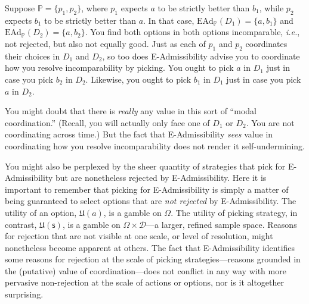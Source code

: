 \documentclass[a4paper]{article}
\newcommand\D{\mathcal{D}}
\newcommand\s{\mathsf{s}}
\renewcommand\P{\mathbb{P}} %
\newcommand\EAd{\mathrm{EAd}}
\newcommand\U{\mathfrak{U}} %
\newcommand{\IP}{\P}
\renewcommand{\color}[1]{}
\newenvironment{CCM rewritten}
{\begingroup\color{blue}} %
{\endgroup}              %
\begin{document}
{{	
	Suppose $\IP = \{p_1, p_2\}$, where $p_1$ expects $a$ to be strictly better than $b_1$, while $p_2$ expects $b_1$ to be strictly better than $a$. In that case, $\EAd_\IP(D_1)=\{a,b_1\}$ and $\EAd_\IP(D_2)=\{a,b_2\}$. You find both options in both options incomparable, \textit{i.e.}, not rejected, but also not equally good. Just as each of $p_1$ and $p_2$ coordinates their choices in $D_1$ and $D_2$, so too does E-Admissibility advise you to coordinate how you resolve incomparability by picking. You ought to pick $a$ in $D_1$ just in case you pick $b_2$ in $D_2$. Likewise, you ought to pick $b_1$ in $D_1$ just in case you pick $a$ in $D_2$. 
	
	
	You might doubt that there is \textit{really} any value in this sort of ``modal coordination.'' (Recall, you will actually only face one of $D_1$ or $D_2$. You are not coordinating across time.) But the fact that E-Admissibility \textit{sees} value in coordinating how you resolve incomparability does not render it self-undermining.
	
	You might also be perplexed by the sheer quantity of strategies that pick for E-Admissibility but are nonetheless rejected by E-Admissibility. Here it is important to remember that picking for E-Admissibility is simply a matter of being guaranteed to select options that are \textit{not rejected} by E-Admissibility. The utility of an option, $\U(a)$, is a gamble on $\Omega$. The utility of picking strategy, in contrast, $\U(\s)$, is a gamble on $\Omega\times\D$---a larger, refined sample space. Reasons for rejection that are not visible at one scale, or level of resolution, might nonetheless become apparent at others. The fact that E-Admissibility identifies some reasons for rejection at the scale of picking strategies---reasons grounded in the (putative) value of coordination---does not conflict in any way with more pervasive non-rejection at the scale of actions or options, nor is it altogether surprising. 
}


}
\end{document}
